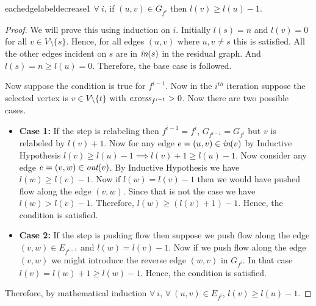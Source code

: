 \begin{lemma}{}{eachedgelabeldecrease1}
	$\forall\ i$, if $(u,v)\in G_{f^i}$ then $l(v)\geq l(u)-1$.
\end{lemma}
\begin{proof}
	We will prove this using induction on $i$. Initially $l(s)=n$ and $l(v)=0$ for all $v\in V\setminus\{s\}$. Hence, for all edges $(u,v)$ where $u,v\neq s$ this is satisfied. All the other edges incident on $s$ are in $\emph{in}(s)$ in the residual graph. And $l(s)=n\geq l(u)=0$. Therefore, the base case is followed.

	Now suppose the condition is true for $f^{i-1}$. Now in the $i^{th}$ iteration   suppose the selected vertex is $v\in V\setminus\{t\}$ with $\emph{excess}_{f^{i-1}}>0$. Now there are two possible cases.\begin{itemize}[label=$\bullet$]
		\item \textbf{Case 1:} If the step is relabeling then $f^{i-1}=f^i$, $G_{f^{i-1}}=G_{f^i}$ but $v$ is relabeled by $l(v)+1$. Now for any edge $e=(u,v)\in \emph{in}(v)$ by Inductive Hypothesis $l(v)\geq l(u)-1\implies l(v)+1\geq l(u)-1$. Now consider any edge $e=(v,w)\in \emph{out}(v)$.  By Inductive Hypothesis we have $l(w)\geq l(v)-1$. Now if $l(w)=l(v)-1$ then we would have pushed flow along the edge $(v,w)$. Since that is not the case we have $l(w)>l(v)-1$. Therefore, $l(w)\geq (l(v)+1)-1$. Hence, the condition is satisfied.
		\item \textbf{Case 2:} If the step is pushing flow then suppose we push flow along the edge $(v,w)\in E_{f^{i-1}}$ and $l(w)=l(v)-1$. Now if we push flow along the edge $(v,w)$ we might introduce the reverse edge $(w,v)$ in $G_{f^i}$. In that case $l(v)=l(w)+1\geq l(w)-1$. Hence, the condition is satisfied.
	\end{itemize}
	Therefore, by mathematical induction $\forall\ i$, $\forall \ (u,v)\in E_{f^i}$, $l(v)\geq l(u)-1$.
\end{proof}

